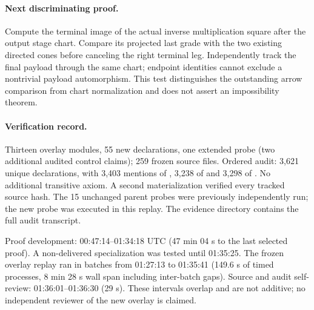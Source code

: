 \documentclass[10pt]{article}
\begin{document}
\paragraph{Next discriminating proof.}
Compute the terminal image of the actual inverse multiplication square after the output stage chart. Compare its projected last grade with the two existing directed cones before canceling the right terminal leg. Independently track the final payload through the same chart; endpoint identities cannot exclude a nontrivial payload automorphism. This test distinguishes the outstanding arrow comparison from chart normalization and does not assert an impossibility theorem.
\paragraph{Verification record.} Thirteen overlay modules, 55 new declarations, one extended probe (two additional audited control claims); 259 frozen source files. Ordered audit: 3,621 unique declarations, with 3,403 mentions of , 3,238 of  and 3,298 of . No additional transitive axiom. A second materialization verified every tracked source hash. The 15 unchanged parent probes were previously independently run; the new probe was executed in this replay. The evidence directory contains the full audit transcript.
\par Proof development: 00:47:14--01:34:18 UTC (47 min 04 s to the last selected proof). A non-delivered specialization was tested until 01:35:25. The frozen overlay replay ran in batches from 01:27:13 to 01:35:41 (149.6 s of timed processes, 8 min 28 s wall span including inter-batch gaps). Source and audit self-review: 01:36:01--01:36:30 (29 s). These intervals overlap and are not additive; no independent reviewer of the new overlay is claimed.
\end{document}
